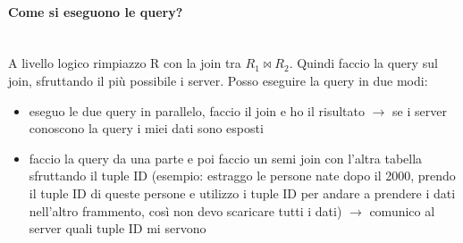 \paragraph{Come si eseguono le query?}\\
A livello logico rimpiazzo R con la join tra \(R_1 \bowtie R_2\).
Quindi faccio la query sul join, sfruttando il più possibile i server. Posso eseguire la query in due modi: 
\begin{itemize}
    \item eseguo le due query in parallelo, faccio il join e ho il risultato \(\rightarrow\) se i server conoscono la query i miei dati sono esposti
    \item faccio la query da una parte e poi faccio un semi join con l’altra tabella sfruttando il tuple ID (esempio: estraggo le persone nate dopo il 2000, prendo il tuple ID di queste persone e utilizzo i tuple ID per andare a prendere i dati nell’altro frammento, così non devo scaricare tutti i dati) \(\rightarrow\) comunico al server quali tuple ID mi servono
\end{itemize}
